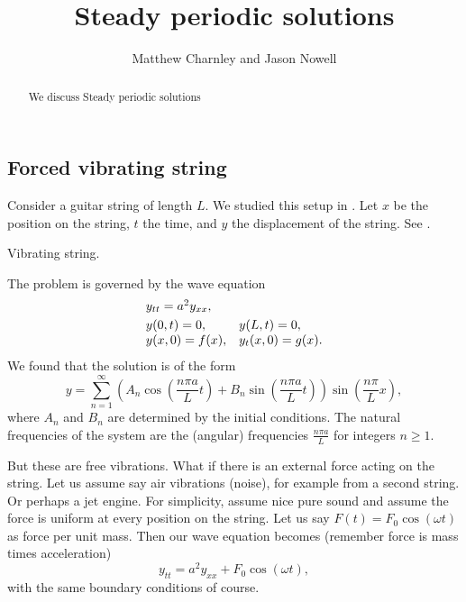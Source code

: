 \documentclass{ximera}
\title{Steady periodic solutions}
\author{Matthew Charnley and Jason Nowell}
\begin{document}
\begin{abstract}
    We discuss Steady periodic solutions
\end{abstract}
\maketitle


\label{sps:section}

%

\subsection{Forced vibrating string}

Consider a guitar string of length $L$.  We studied this  setup in . Let $x$ be the position on the string, $t$ the time, and $y$ the displacement of the string.  See .

\begin{myfig}
    \capstart
    
    \caption{Vibrating string.\label{sps:vibstrfig}}
\end{myfig}

The problem is governed by the wave equation
\begin{equation} \label{sps:freevib}
    \begin{array}{ll}
        y_{tt} = a^2 y_{xx} , & \\
        \noalign{\smallskip}
        y(0,t) = 0 , & y(L,t) = 0 , \\
        y(x,0) = f(x) , & y_t(x,0) = g(x) .
    \end{array}
\end{equation}
We found that the solution is of the form
\begin{equation*}
    y = \sum_{n=1}^\infty \left( A_n \cos \left( \frac{n\pi a}{L} t \right) + B_n \sin \left( \frac{n\pi a}{L} t \right) \right) \sin \left( \frac{n\pi}{L} x \right) ,
\end{equation*}
where $A_n$ and $B_n$ are determined by the initial conditions.  The natural frequencies of the system are the (angular) frequencies $\frac{n \pi a}{L}$ for integers $n \geq 1$.

But these are free vibrations.  What if there is an external force acting on the string.  Let us assume say air vibrations (noise), for example from a second string.  Or perhaps a jet engine.  For simplicity, assume nice pure sound and assume the force is uniform at every position on the string. Let us say $F(t) = F_0 \cos (\omega t)$ as force per unit mass.  Then our wave equation becomes (remember force is mass times acceleration)
\begin{equation} \label{sps:forcedeq}
    y_{tt} = a^2 y_{xx} + F_0 \cos ( \omega t) ,
\end{equation}
with the same boundary conditions of course.
\end{document}
